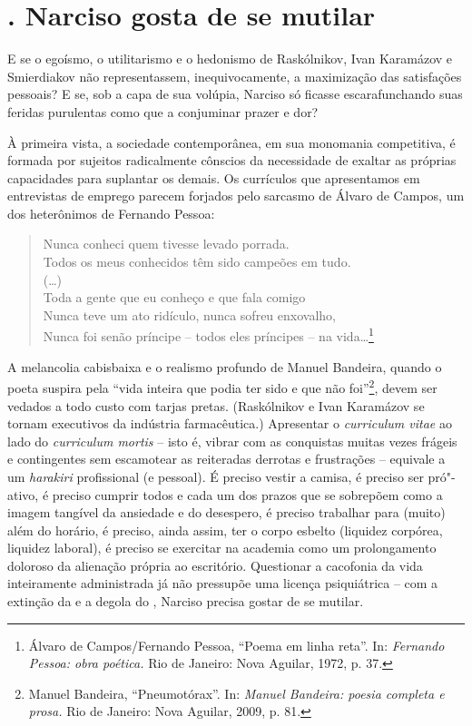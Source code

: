 \section{. Narciso gosta de se mutilar}

E se o egoísmo, o utilitarismo e o hedonismo de Raskólnikov, Ivan
Karamázov e Smierdiakov não representassem, inequivocamente, a
maximização das satisfações pessoais? E se, sob a capa de sua volúpia,
Narciso só ficasse escarafunchando suas feridas purulentas como que a
conjuminar prazer e dor?

À primeira vista, a sociedade contemporânea, em sua monomania
competitiva, é formada por sujeitos radicalmente cônscios da necessidade
de exaltar as próprias capacidades para suplantar os demais. Os
currículos que apresentamos em entrevistas de emprego parecem forjados
pelo sarcasmo de Álvaro de Campos, um dos heterônimos de Fernando
Pessoa:

\begin{verse}
Nunca conheci quem tivesse levado porrada.\\
Todos os meus conhecidos têm sido campeões \qb{}em tudo.\\
(\ldots{})\\[10pt]
Toda a gente que eu conheço e que fala comigo\\
Nunca teve um ato ridículo, nunca sofreu \qb{}enxovalho,\\
Nunca foi senão príncipe -- todos eles príncipes -- \qb{}na vida\ldots{}\footnote{Álvaro
  de Campos/Fernando Pessoa, ``Poema em linha reta''. In: \emph{Fernando
  Pessoa: obra poética.} Rio de Janeiro: Nova Aguilar, 1972, p. 37.}
\end{verse}

A melancolia cabisbaixa e o realismo profundo de Manuel Bandeira, quando
o poeta suspira pela ``vida inteira que podia ter sido e que não
foi''\footnote{Manuel Bandeira, ``Pneumotórax''. In: \emph{Manuel
  Bandeira: poesia completa e prosa.} Rio de Janeiro: Nova Aguilar,
  2009, p. 81.}, devem ser vedados a todo custo com tarjas pretas.
(Raskólnikov e Ivan Karamázov se tornam executivos da indústria
farmacêutica.) Apresentar o \emph{curriculum vitae} ao lado do
\emph{curriculum mortis} -- isto é, vibrar com as conquistas muitas
vezes frágeis e contingentes sem escamotear as reiteradas derrotas e
frustrações -- equivale a um \emph{harakiri} profissional (e pessoal). É
preciso vestir a camisa, é preciso ser pró"-ativo, é preciso cumprir
todos e cada um dos prazos que se sobrepõem como a imagem tangível da
ansiedade e do desespero, é preciso trabalhar para (muito) além do
horário, é preciso, ainda assim, ter o corpo esbelto (liquidez corpórea,
liquidez laboral), é preciso se exercitar na academia como um
prolongamento doloroso da alienação própria ao escritório. Questionar a
cacofonia da vida inteiramente administrada já não pressupõe uma licença
psiquiátrica -- com a extinção da  e a degola do , Narciso
precisa gostar de se mutilar.

